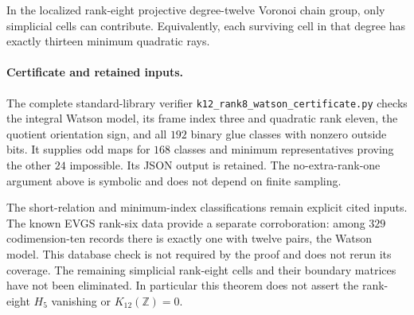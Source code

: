 \begin{corollary}
\label{cor:k12-r8-simplicial-gate}
In the localized rank-eight projective degree-twelve Voronoi
chain group, only simplicial cells can contribute. Equivalently,
each surviving cell in that degree has exactly thirteen minimum
quadratic rays.
\end{corollary}

\paragraph{Certificate and retained inputs.}
The complete standard-library verifier
\texttt{k12\_rank8\_watson\_certificate.py} checks the integral
Watson model, its frame index three and quadratic rank eleven,
the quotient orientation sign, and all $192$ binary glue classes
with nonzero outside bits. It supplies odd maps for $168$ classes
and minimum representatives proving the other $24$ impossible.
Its JSON output is retained. The no-extra-rank-one argument above
is symbolic and does not depend on finite sampling.

The short-relation and minimum-index classifications remain
explicit cited inputs. The known EVGS rank-six data provide a
separate corroboration: among $329$ codimension-ten records there
is exactly one with twelve pairs, the Watson model. This database
check is not required by the proof and does not rerun its coverage.
The remaining simplicial rank-eight cells and their boundary
matrices have not been eliminated. In particular this theorem
does not assert the rank-eight $H_5$ vanishing or
$K_{12}(\mathbb Z)=0$.
